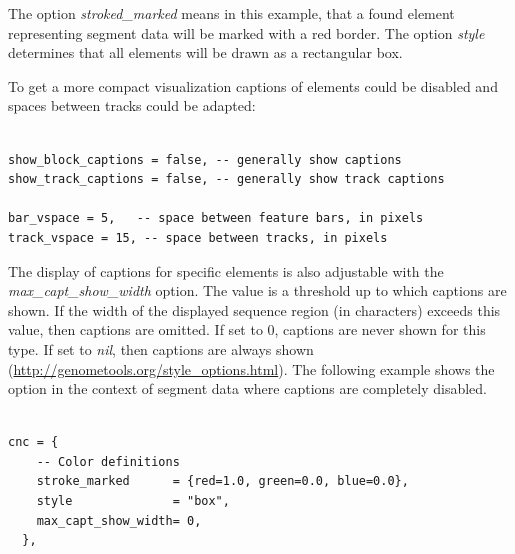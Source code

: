 \documentclass[11pt,final]{article}
\begin{document}
The option \textit{stroked\_marked} means in this example, that a found element
representing segment data will be marked with a red border. The option 
\textit{style} determines that all elements will be drawn as a rectangular
box.

To get a more compact visualization captions of elements could be disabled
and spaces between tracks could be adapted:

\begin{verbatim}

show_block_captions = false, -- generally show captions
show_track_captions = false, -- generally show track captions

bar_vspace = 5,   -- space between feature bars, in pixels
track_vspace = 15, -- space between tracks, in pixels

\end{verbatim}

The display of captions for specific elements is also adjustable with the
\textit{max\_capt\_show\_width} option. The value is a threshold up to which
captions are shown. If the width of the displayed sequence region 
(in characters) exceeds this value, then captions are omitted. If set to 0,
captions are never shown for this type. If set to \textit{nil}, then captions are
always shown (\url{http://genometools.org/style_options.html}).  
The following example shows the option in the context of segment data where 
captions are completely disabled.

\begin{verbatim}

cnc = {
    -- Color definitions
    stroke_marked      = {red=1.0, green=0.0, blue=0.0},
    style              = "box",
    max_capt_show_width= 0,
  }, 


\end{verbatim}

\end{document}
